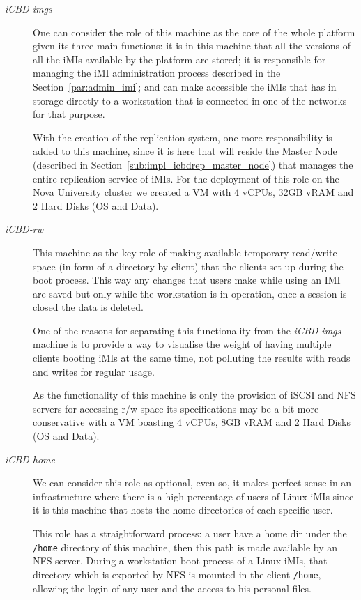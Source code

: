 \begin{description}
	\item [\textit{iCBD-imgs}] One can consider the role of this machine as the core of the whole platform given its three main functions: it is in this machine that all the versions of all the iMIs available by the platform are stored; it is responsible for managing the iMI administration process described in the Section~\ref{par:admin_imi}; and can make accessible the iMIs that has in storage directly to a workstation that is connected in one of the networks for that purpose. 
	
	With the creation of the replication system, one more responsibility is added to this machine, since it is here that will reside the Master Node (described in Section~\ref{sub:impl_icbdrep_master_node}) that manages the entire replication service of iMIs.  For the deployment of this role on the Nova University cluster we created a VM with 4 vCPUs, 32GB vRAM and 2 Hard Disks (OS and Data).
	\item [\textit{iCBD-rw}] This machine as the key role of making available temporary read/write space (in form of a directory by client) that the clients set up during the boot process. This way any changes that users make while using an IMI are saved but only while the workstation is in operation, once a session is closed the data is deleted. 
	
	One of the reasons for separating this functionality from the \textit{iCBD-imgs} machine is to provide a way to visualise the weight of having multiple clients booting iMIs at the same time, not polluting the results with reads and writes for regular usage. 
	
	As the functionality of this machine is only the provision of iSCSI and NFS servers for accessing r/w space its specifications may be a bit more conservative with a VM boasting 4 vCPUs, 8GB vRAM and 2 Hard Disks (OS and Data).
	\item [\textit{iCBD-home}] We can consider this role as optional, even so, it makes perfect sense in an infrastructure where there is a high percentage of users of Linux iMIs since it is this machine that hosts the home directories of each specific user. 

	This role has a straightforward process: a user have a home dir under the \texttt{/home} directory of this machine, then this path is made available by an NFS server. During a workstation boot process of a Linux iMIs, that directory which is exported by NFS is mounted in the client \texttt{/home}, allowing the login of any user and the access to his personal files. 
	

\end{description}

